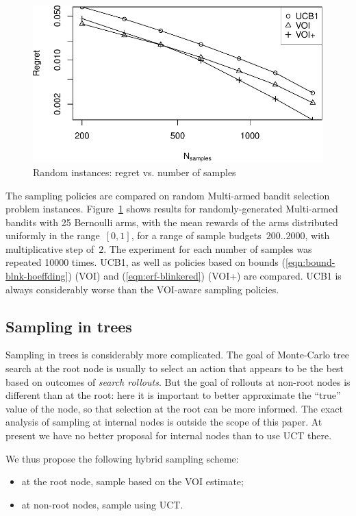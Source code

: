 \documentclass[]{article}
\begin{document}
\begin{figure}[h!]
\centering
\includegraphics[scale=0.6]{flat.pdf}
\caption{Random instances: regret vs. number of samples}
\label{fig:random-instances}
\end{figure}

The sampling policies are compared on random Multi-armed bandit 
selection problem instances. Figure~\ref{fig:random-instances} shows results for
randomly-generated Multi-armed bandits with 25 Bernoulli arms, with
the mean rewards of the arms distributed uniformly in the range~$[0,
  1]$, for a range of sample budgets~$200..2000$, with multiplicative
step of~$2$. The experiment for each number of samples was repeated
10000 times. UCB1, as well as policies  based on bounds
(\ref{eqn:bound-blnk-hoeffding}) (VOI) and
(\ref{eqn:erf-blinkered}) (VOI+) are compared. UCB1 is always considerably worse than the
VOI-aware sampling policies.

\subsection{Sampling in trees}

Sampling in trees is considerably more complicated.
The goal of Monte-Carlo tree search \citep{Chaslot.montecarlo} at the root node 
is usually to select an action that appears to be the best based on outcomes
of \textit{search rollouts}.
But the goal of rollouts at non-root nodes
is different than at the root: here it is important to better approximate the ``true'' 
value of the node, so that selection at the root can be more informed. The exact analysis
of sampling at internal nodes is outside the scope of this paper. At present we 
have no better proposal for internal nodes than to use UCT there.

We thus propose the following hybrid sampling scheme:
\begin{itemize}
\item at the root node, sample based on the VOI estimate;
\item at non-root nodes, sample using UCT.
\end{itemize}
\end{document}
